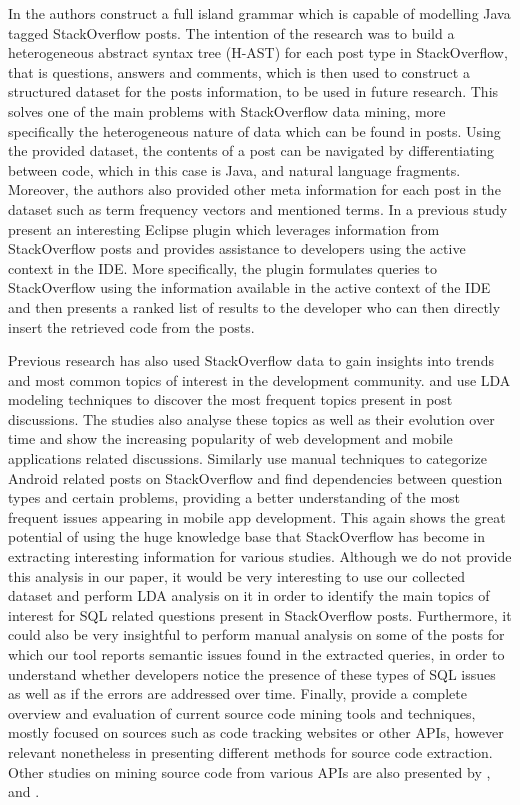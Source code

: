 In \citet{P026} the authors construct a full island grammar which is capable of modelling Java tagged StackOverflow posts. The intention of the research was to build a heterogeneous abstract syntax tree (H-AST) for each post type in StackOverflow, that is questions, answers and comments, which is then used to construct a structured dataset for the posts information, to be used in future research. This solves one of the main problems with StackOverflow data mining, more specifically the heterogeneous nature of data which can be found in posts. Using the provided dataset, the contents of a post can be navigated by differentiating between code, which in this case is Java, and natural language fragments. Moreover, the authors also provided other meta information for each post in the dataset such as term frequency vectors and mentioned terms. In a previous study \citet{P027} present an interesting Eclipse plugin which leverages information from StackOverflow posts and provides assistance to developers using the active context in the IDE. More specifically, the plugin formulates queries to StackOverflow using the information available in the active context of the IDE and then presents a ranked list of results to the developer who can then directly insert the retrieved code from the posts.

Previous research has also used StackOverflow data to gain insights into trends and most common topics of interest in the development community. \citet{P029} and \citet{P030} use LDA modeling techniques to discover the most frequent topics present in post discussions. The studies also analyse these topics as well as their evolution over time and show the increasing popularity of web development and mobile applications related discussions. Similarly \citet{P031} use manual techniques to categorize Android related posts on StackOverflow and find dependencies between question types and certain problems, providing a better understanding of the most frequent issues appearing in mobile app development. This again shows the great potential of using the huge knowledge base that StackOverflow has become in extracting interesting information for various studies. Although we do not provide this analysis in our paper, it would be very interesting to use our collected dataset and perform LDA analysis on it in order to identify the main topics of interest for SQL related questions present in StackOverflow posts. Furthermore, it could also be very insightful to perform manual analysis on some of the posts for which our tool reports semantic issues found in the extracted queries, in order to understand whether developers notice the presence of these types of SQL issues as well as if the errors are addressed over time. Finally, \citet{P032} provide a complete overview and evaluation of current source code mining tools and techniques, mostly focused on sources such as code tracking websites or other APIs, however relevant nonetheless in presenting different methods for source code extraction. Other studies on mining source code from various APIs are also presented by \citet{P033}, \citet{P034} and \citet{P035}.
